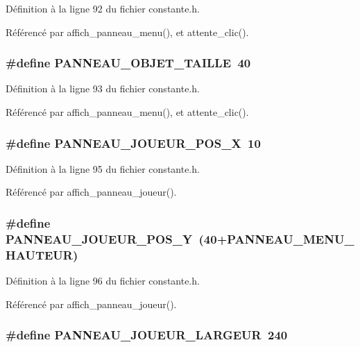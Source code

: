 D\'{e}finition \`{a} la ligne 92 du fichier constante.h.

R\'{e}f\'{e}renc\'{e} par affich\_\-panneau\_\-menu(), et attente\_\-clic().
\subsubsection{\setlength{\rightskip}{0pt plus 5cm}\#define PANNEAU\_\-OBJET\_\-TAILLE~40}\label{constante_8h_fa4e4c3319369974d049b47650a229d0}




D\'{e}finition \`{a} la ligne 93 du fichier constante.h.

R\'{e}f\'{e}renc\'{e} par affich\_\-panneau\_\-menu(), et attente\_\-clic().
\subsubsection{\setlength{\rightskip}{0pt plus 5cm}\#define PANNEAU\_\-JOUEUR\_\-POS\_\-X~10}\label{constante_8h_ef54f62994732685519fef2a92138b8a}




D\'{e}finition \`{a} la ligne 95 du fichier constante.h.

R\'{e}f\'{e}renc\'{e} par affich\_\-panneau\_\-joueur().
\subsubsection{\setlength{\rightskip}{0pt plus 5cm}\#define PANNEAU\_\-JOUEUR\_\-POS\_\-Y~(40+PANNEAU\_\-MENU\_\-HAUTEUR)}\label{constante_8h_27c02f6d83a54676fb8fa2ad65c431b5}




D\'{e}finition \`{a} la ligne 96 du fichier constante.h.

R\'{e}f\'{e}renc\'{e} par affich\_\-panneau\_\-joueur().
\subsubsection{\setlength{\rightskip}{0pt plus 5cm}\#define PANNEAU\_\-JOUEUR\_\-LARGEUR~240}\label{constante_8h_7fe305d99da7b7bdb066c46610504070}




